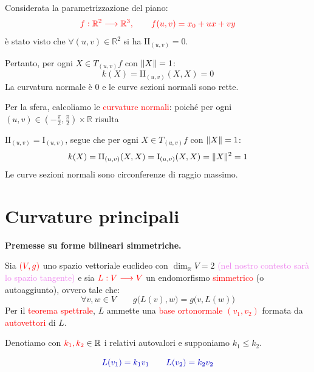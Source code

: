         \begin{esempio}[Piano]
        \mbox{}

            Considerata la parametrizzazione del piano:
            \[
            \textcolor{red}{f : \mathbb{R}^2 \longrightarrow \mathbb{R}^3, \qquad f(u,v) = x_0 + ux + vy}
            \]
            è stato visto che $\forall (u,v) \in \mathbb{R}^2$ si ha $\mathrm{II}_{(u,v)} = 0$.
            
            Pertanto, per ogni $X \in T_{(u,v)}f$ con $\lVert X\rVert = 1$:
            \[
            k(X) = \mathrm{II}_{(u,v)}(X,X) = 0
            \]
            La curvatura normale è $0$ e le curve sezioni normali sono rette.
        \end{esempio}
        \begin{esempio}[Sfera]
        \mbox{}

            Per la sfera, calcoliamo le \textcolor{red}{curvature normali}: poiché per ogni $(u,v) \in \left(-\frac{\pi}{2}, \frac{\pi}{2}\right) \times \mathbb{R}$ risulta
            
            $\mathrm{II}_{(u,v)} = \mathrm{I}_{(u,v)}$, segue che per ogni $X \in T_{(u,v)}f$ con $\lVert X\rVert = 1$:
            \[
            k(X) = \mathrm{II}_{(u,v)}(X,X) = \mathrm{I}_{(u,v)}(X,X) = \lVert X\rVert^2 = 1
            \]
            Le curve sezioni normali sono circonferenze di raggio massimo.
        \end{esempio}
    \section{Curvature principali}
        \noindent \textbf{Premesse su forme bilineari simmetriche.}

        Sia $\textcolor{red}{(V,g)}$ uno spazio vettoriale euclideo con $\dim_{\mathbb{R}} V = 2$ 
        \textcolor{violet}{(nel nostro contesto sarà lo spazio tangente)} e sia $\textcolor{red}{L : V \longrightarrow V}$ un endomorfismo \textcolor{red}{simmetrico} (o autoaggiunto), ovvero tale che:
        \[
        \forall v, w \in V \qquad g\big(L(v), w\big) = g\big(v, L(w)\big)
        \]
        Per il \textcolor{red}{teorema spettrale}, $L$ ammette una \textcolor{red}{base ortonormale $(v_1, v_2)$} formata da \textcolor{red}{autovettori} di $L$.
        
        Denotiamo con $\textcolor{red}{k_1, k_2} \in \mathbb{R}$ i relativi autovalori e supponiamo $k_1 \le k_2$.

        \[ \color{blu} L(v_1) = k_1 v_1 \qquad L(v_2) = k_2 v_2 \]

